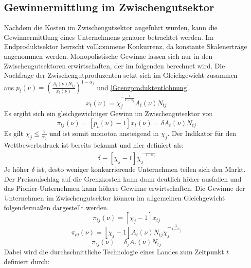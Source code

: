\subsection{Gewinnermittlung im Zwischengutsektor}\label{sec:Gewinnermittlung Zwischengutsektor}
Nachdem die Kosten im Zwischengutsektor angeführt wurden, kann die Gewinnermittlung eines Unternehmens genauer betrachtet werden. Im Endproduktsektor herrscht vollkommene Konkurrenz, da konstante Skalenerträge angenommen werden. Monopolistische Gewinne lassen sich nur in den Zwischengutsektoren erwirtschaften, der im folgenden berechnet wird. Die Nachfrage der Zwischengutproduzenten setzt sich im Gleichgewicht zusammen aus $p_t(\nu)=\left(\frac{A_t(\nu)N_{tj}}{x_t(\nu)}\right)^{1-\alpha_j}$ und \eqref{Grenzproduktentlohnung}.
%
	\begin{equation}
		x_t(\nu)=\chi_j^{-\frac{1}{1-\alpha_j}}A_t(\nu)N_{tj}\label{gleichgewichtige Nachfrage}
	\end{equation}
%
Es ergibt sich ein gleichgewichtiger Gewinn im Zwischengutsektor von
%
	\begin{equation}
		\pi_{tj}(\nu)=[p_t(\nu)-1]x_t(\nu)=\delta A_t(\nu)N_{tj}\label{Gewinn Zwischengutsektor}
	\end{equation}
%
Es gilt $\chi_j\leq\frac{1}{\alpha_j}$ und ist somit monoton ansteigend in $\chi_j$. Der Indikator für den Wettbewerbsdruck ist bereits bekannt und hier definiert als: 
%
	\begin{equation}
		\delta\equiv[\chi_j-1]\chi_j^{-\frac{1}{1-\alpha_j}}
	\end{equation}
%
Je höher $\delta$ ist, desto weniger konkurrierende Unternehmen teilen sich den Markt. Der Preisaufschlag auf die Grenzkosten kann dann deutlich höher ausfallen und das Pionier-Unternehmen kann höhere Gewinne erwirtschaften. Die Gewinne der Unternehmen im Zwischengutsektor können im allgemeinen Gleichgewicht folgendermaßen dargestellt werden.
%
	\begin{equation}
		\pi_{tj}(\nu)=[\chi_{j}-1]x_{tj}
	\end{equation}
%
\vspace{-0.5cm}
%
	\begin{equation}
		\pi_{tj}(\nu)=[\chi_{j}-1]A_{t}(\nu)N_{tj}\chi_{j}^{-\frac{1}{1-\alpha_{j}}}
	\end{equation}
%
\vspace{-0.5cm}
%	
	\begin{equation}
		\pi_{tj}(\nu)=\delta_{j}A_{t}(\nu)N_{tj}
	\end{equation}
%
Dabei wird die durchschnittliche Technologie eines Landes zum Zeitpunkt $t$ definiert durch: 
